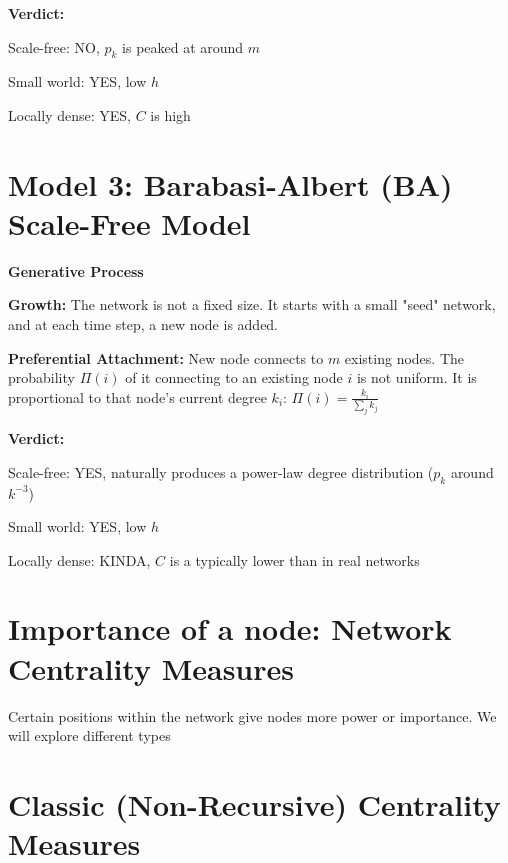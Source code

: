 \textbf{Verdict:}
\begin{tightitemize}
    \item Scale-free: NO, $p_k$ is peaked at around $m$
    \item Small world: YES, low $h$
    \item Locally dense: YES, $C$ is high 
\end{tightitemize}

\section*{Model 3: Barabasi-Albert (BA) Scale-Free Model}

\textbf{Generative Process}

\begin{tightitemize}
    \item \textbf{Growth:} The network is not a fixed size. It starts with a small "seed" 
    network, and at each time step, a new node is added.
    \item \textbf{Preferential Attachment:} New node connects to $m$ existing nodes. 
    The probability $\Pi(i)$ of it connecting to an existing node $i$ is not uniform. 
    It is proportional to that node's current degree $k_i$:
    $
    \Pi(i) = \frac{k_i}{\sum_{j}k_j}
    $
\end{tightitemize}

\textbf{Verdict:}
\begin{tightitemize}
    \item Scale-free: YES, naturally produces a power-law degree distribution ($p_k$ around $k^{-3}$)
    \item Small world: YES, low $h$
    \item Locally dense: KINDA, $C$ is a typically lower than in real networks
\end{tightitemize}

\section*{Importance of a node: Network Centrality Measures}

Certain positions within the network give nodes more power or importance.
We will explore different types

\section*{Classic (Non-Recursive) Centrality Measures}

